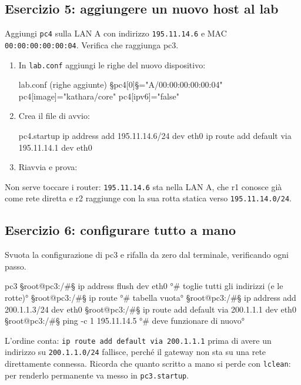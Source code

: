 \subsection{Esercizio 5: aggiungere un nuovo host al lab}
\begin{esempio}[Consegna]
Aggiungi \texttt{pc4} sulla LAN A con indirizzo \texttt{195.11.14.6} e MAC \texttt{00:00:00:00:00:04}. Verifica che raggiunga pc3.
\end{esempio}
\begin{tecnica}[Soluzione]
\begin{enumerate}
  \item In \texttt{lab.conf} aggiungi le righe del nuovo dispositivo:
\begin{filecfg}{lab.conf (righe aggiunte)}
§pc4[0]§="A/00:00:00:00:00:04"
pc4[image]="kathara/core"
pc4[ipv6]="false"
\end{filecfg}
  \item Crea il file di avvio:
\begin{filecfg}{pc4.startup}
ip address add 195.11.14.6/24 dev eth0
ip route add default via 195.11.14.1 dev eth0
\end{filecfg}
  \item Riavvia e prova:
\end{enumerate}
Non serve toccare i router: \texttt{195.11.14.6} sta nella LAN A, che r1 conosce già come rete diretta e r2 raggiunge con la sua rotta statica verso \texttt{195.11.14.0/24}.
\end{tecnica}

\subsection{Esercizio 6: configurare tutto a mano}
\begin{esempio}[Consegna]
Svuota la configurazione di pc3 e rifalla da zero dal terminale, verificando ogni passo.
\end{esempio}
\begin{terminale}{pc3}
§root@pc3:/#§ ip address flush dev eth0            °# toglie tutti gli indirizzi (e le rotte)°
§root@pc3:/#§ ip route                             °# tabella vuota°
§root@pc3:/#§ ip address add 200.1.1.3/24 dev eth0
§root@pc3:/#§ ip route add default via 200.1.1.1 dev eth0
§root@pc3:/#§ ping -c 1 195.11.14.5               °# deve funzionare di nuovo°
\end{terminale}
\begin{attenzione}
L'ordine conta: \texttt{ip route add default via 200.1.1.1} prima di avere un indirizzo su \texttt{200.1.1.0/24} fallisce, perché il gateway non sta su una rete direttamente connessa. Ricorda che quanto scritto a mano si perde con \texttt{lclean}: per renderlo permanente va messo in \texttt{pc3.startup}.
\end{attenzione}
